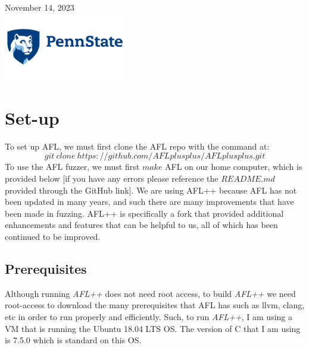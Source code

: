 \documentclass[11pt]{article}
\begin{document}
\begin{titlepage}
{\large November 14, 2023}\\[2cm] 


\includegraphics[width=200px, keepaspectratio]{logo.png}\\
 

\vfill

\end{titlepage}

\section{Set-up}

To set up AFL, we must first clone the AFL repo with the command at:
\begin{equation}
    git \: clone \: https://github.com/AFLplusplus/AFLplusplus.git
\end{equation}
To use the AFL fuzzer, we must first $make$ AFL on our home computer, which is provided below [if you have any errors please reference the $README.md$ provided through the GitHub link]. We are using AFL++ because AFL has not been updated in many years, and such there are many improvements that have been made in fuzzing. AFL++ is specifically a fork that provided additional enhancements and features that can be helpful to us, all of which has been continued to be improved.
\\
\subsection{Prerequisites}
Although running \textit{AFL++} does not need root access, to build \textit{AFL++} we need root-access to download the many prerequisites that AFL has such as llvm, clang, etc in order to run properly and efficiently. Such, to run \textit{AFL++}, I am using a VM that is running the Ubuntu 18.04 LTS OS. The version of C that I am using is  7.5.0 which is standard on this OS. 
\end{document}
